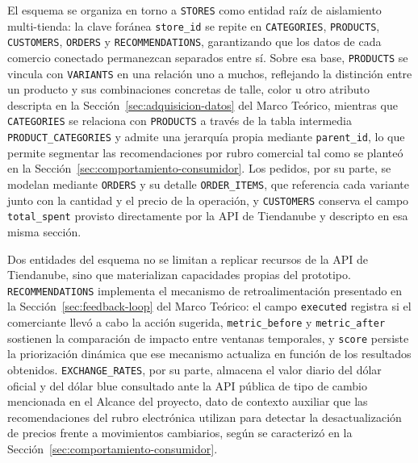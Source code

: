 El esquema se organiza en torno a \texttt{STORES} como entidad raíz de aislamiento multi-tienda: la clave foránea \texttt{store\_id} se repite en \texttt{CATEGORIES}, \texttt{PRODUCTS}, \texttt{CUSTOMERS}, \texttt{ORDERS} y \texttt{RECOMMENDATIONS}, garantizando que los datos de cada comercio conectado permanezcan separados entre sí. Sobre esa base, \texttt{PRODUCTS} se vincula con \texttt{VARIANTS} en una relación uno a muchos, reflejando la distinción entre un producto y sus combinaciones concretas de talle, color u otro atributo descripta en la Sección~\ref{sec:adquisicion-datos} del Marco Teórico, mientras que \texttt{CATEGORIES} se relaciona con \texttt{PRODUCTS} a través de la tabla intermedia \texttt{PRODUCT\_CATEGORIES} y admite una jerarquía propia mediante \texttt{parent\_id}, lo que permite segmentar las recomendaciones por rubro comercial tal como se planteó en la Sección~\ref{sec:comportamiento-consumidor}. Los pedidos, por su parte, se modelan mediante \texttt{ORDERS} y su detalle \texttt{ORDER\_ITEMS}, que referencia cada variante junto con la cantidad y el precio de la operación, y \texttt{CUSTOMERS} conserva el campo \texttt{total\_spent} provisto directamente por la API de Tiendanube y descripto en esa misma sección.

Dos entidades del esquema no se limitan a replicar recursos de la API de Tiendanube, sino que materializan capacidades propias del prototipo. \texttt{RECOMMENDATIONS} implementa el mecanismo de retroalimentación presentado en la Sección~\ref{sec:feedback-loop} del Marco Teórico: el campo \texttt{executed} registra si el comerciante llevó a cabo la acción sugerida, \texttt{metric\_before} y \texttt{metric\_after} sostienen la comparación de impacto entre ventanas temporales, y \texttt{score} persiste la priorización dinámica que ese mecanismo actualiza en función de los resultados obtenidos. \texttt{EXCHANGE\_RATES}, por su parte, almacena el valor diario del dólar oficial y del dólar blue consultado ante la API pública de tipo de cambio mencionada en el Alcance del proyecto, dato de contexto auxiliar que las recomendaciones del rubro electrónica utilizan para detectar la desactualización de precios frente a movimientos cambiarios, según se caracterizó en la Sección~\ref{sec:comportamiento-consumidor}.

\FloatBarrier

